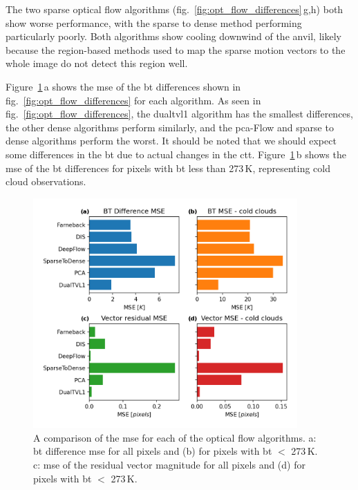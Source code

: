 The two sparse optical flow algorithms (fig.~\ref{fig:opt_flow_differences}\,g,h) both show worse performance, with the sparse to dense method performing particularly poorly.
Both algorithms show cooling downwind of the anvil, likely because the region-based methods used to map the sparse motion vectors to the whole image do not detect this region well.

Figure~\ref{fig:opt_flow_mse}\,a shows the \acrfull{mse} of the \acrshort{bt} differences shown in fig.~\ref{fig:opt_flow_differences} for each algorithm.
As seen in fig.~\ref{fig:opt_flow_differences}, the \acrshort{dualtvl1} algorithm has the smallest differences, the other dense algorithms perform similarly, and the \acrshort{pca}-Flow and sparse to dense algorithms perform the worst.
It should be noted that we should expect some differences in the \acrshort{bt} due to actual changes in the \acrshort{ctt}.
Figure~\ref{fig:opt_flow_mse}\,b shows the \acrshort{mse} of the \acrshort{bt} differences for pixels with \acrshort{bt} less than 273\,\unit{K}, representing cold cloud observations.


\begin{figure}[tp]
    \includegraphics[width=0.9\textwidth]{figures/chapter1_12.png}
    \caption[
    A comparison of the \acrshort{bt} difference and residual vector magnitude \acrshort{mse} for each of the optical flow algorithms
    ]{
    A comparison of the \acrshort{mse} for each of the optical flow algorithms. a: \acrshort{bt} difference \acrshort{mse} for all pixels and (b) for pixels with \acrshort{bt} $<$ 273\,\unit{K}. c: \acrshort{mse} of the residual vector magnitude for all pixels and (d) for pixels with \acrshort{bt} $<$ 273\,\unit{K}.
    }
    \label{fig:opt_flow_mse}
\end{figure}


